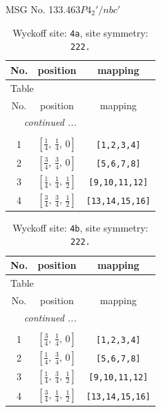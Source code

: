 \documentclass[fleqn,8pt]{jsarticle}
\begin{document}
\setcounter{MaxMatrixCols}{32}

\renewcommand{\tablename}{Table~}
\renewcommand{\figurename}{Figure~}
\begin{center}
\LARGE
MSG No. 133.463\quad$P4_{2}'/nbc'$
\end{center}
\renewcommand{\arraystretch}{1.2}
\begin{longtable}{ccc}
\caption{Wyckoff site: {\tt 4a}, site symmetry: {\tt 222.}}
 \\
 \hline \hline
No. & position & mapping \\ \hline \endfirsthead

\multicolumn{2}{l}{\tablename\ \thetable{}} \\
 \hline \hline
No. & position & mapping \\ \hline \endhead

 \hline \hline
\multicolumn{2}{r}{\footnotesize\it continued ...} \\ \endfoot

 \hline \hline
\multicolumn{2}{r}{} \\ \endlastfoot

1 & $\left[ \frac{1}{4},\, \frac{1}{4},\, 0 \right]$ & {\tt [1,2,3,4]} \\ \hline
2 & $\left[ \frac{3}{4},\, \frac{3}{4},\, 0 \right]$ & {\tt [5,6,7,8]} \\ \hline
3 & $\left[ \frac{1}{4},\, \frac{1}{4},\, \frac{1}{2} \right]$ & {\tt [9,10,11,12]} \\ \hline
4 & $\left[ \frac{3}{4},\, \frac{3}{4},\, \frac{1}{2} \right]$ & {\tt [13,14,15,16]} \\
\end{longtable}
\renewcommand{\arraystretch}{1.2}
\begin{longtable}{ccc}
\caption{Wyckoff site: {\tt 4b}, site symmetry: {\tt 222.}}
 \\
 \hline \hline
No. & position & mapping \\ \hline \endfirsthead

\multicolumn{2}{l}{\tablename\ \thetable{}} \\
 \hline \hline
No. & position & mapping \\ \hline \endhead

 \hline \hline
\multicolumn{2}{r}{\footnotesize\it continued ...} \\ \endfoot

 \hline \hline
\multicolumn{2}{r}{} \\ \endlastfoot

1 & $\left[ \frac{3}{4},\, \frac{1}{4},\, 0 \right]$ & {\tt [1,2,3,4]} \\ \hline
2 & $\left[ \frac{1}{4},\, \frac{3}{4},\, 0 \right]$ & {\tt [5,6,7,8]} \\ \hline
3 & $\left[ \frac{1}{4},\, \frac{3}{4},\, \frac{1}{2} \right]$ & {\tt [9,10,11,12]} \\ \hline
4 & $\left[ \frac{3}{4},\, \frac{1}{4},\, \frac{1}{2} \right]$ & {\tt [13,14,15,16]} \\
\end{longtable}
\end{document}
